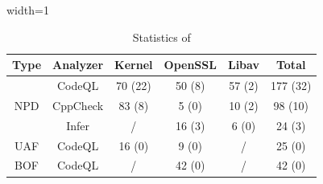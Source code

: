 \begin{table}[htb]
    \centering
    \caption{Statistics of \ourbench{}}\label{table:benchmark}
    \footnotesize
    \begin{adjustbox}{width=1\linewidth}
        \begin{tabular}{c|c|c|c|c|c}
        \hline
        \textbf{Type} & \textbf{Analyzer} & \textbf{Kernel} &
        \textbf{OpenSSL} & \textbf{Libav} &
        \textbf{Total}  \\ \hline

        \multirow{3}{*}{NPD}& CodeQL &  70 (22) & 50 (8) & 57 (2) & 177 (32) \\
        & CppCheck & 83 (8)  & 5 (0) & 10 (2) & 98 (10) \\
        & Infer & / & 16 (3) & 6 (0) & 24 (3) \\\hline 
        
        \multirow{1}{*}{UAF}& CodeQL & 16 (0) & 9 (0) & / & 25 (0)  \\\hline 

        \multirow{1}{*}{BOF}& CodeQL & /  & 42 (0) & / & 42 (0) \\\hline 

        \end{tabular}
    \end{adjustbox}
\end{table}